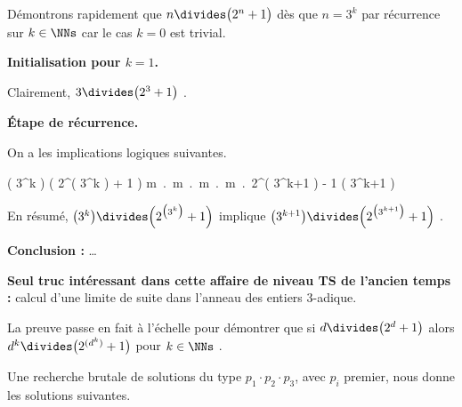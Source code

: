 \documentclass[12pt]{article}
\begin{document}
Démontrons rapidement que $n \divides \big( 2^n + 1 \big)$ dès que $n = 3^k$ par récurrence sur $k \in \NNs$ car le cas $k = 0$ est trivial.

\bigskip

\textbf{Initialisation pour $k = 1$.}

\smallskip

Clairement, $3 \divides \big( 2^3 + 1 \big)$ .

\bigskip

\textbf{Étape de récurrence.}

\smallskip

On a les implications logiques suivantes.

\medskip

\begin{stepcalc}[style=ar*, ope=\implies]
	\big( 3^k \big) \divides \Big( 2^{\big( 3^k \big)} + 1 \Big)
\explnext{}
	\exists m \in \ZZ \,.\, \Big[ 2^{\big( 3^k \big)} + 1 = m \cdot 3^k  \Big]
\explnext{}
	\exists m \in \ZZ \,.\, \Big[ 2^{\big( 3^k \big)} = - 1 + m \cdot 3^k  \Big]
\explnext{}
	\exists m \in \ZZ \,.\, \Big[ \left( 2^{\big( 3^k \big)} \right)^3 = \big( - 1 + m \cdot 3^k \big)^3  \Big]
\explnext{}
	\exists m \in \ZZ \,.\, \Big[ 2^{\big( 3^{k+1} \big)} = - 1 + 3 \cdot m \cdot 3^k - 3 \cdot \big( m \cdot 3^k \big)^2 + \big( m \cdot 3^k \big)^3  \Big]
	2^{\big( 3^{k+1} \big)} \equiv - 1 \mod\!\big( 3^{k+1} \big)
\end{stepcalc}

\smallskip

En résumé, 
$\big( 3^k \big) \divides \Big( 2^{\big( 3^k \big)} + 1 \Big)$ 
implique
$\big( 3^{k+1} \big) \divides \Big( 2^{\big( 3^{k+1} \big)} + 1 \Big)$  .

\bigskip

\textbf{Conclusion :} \dots

\bigskip

\textbf{Seul truc intéressant dans cette affaire de niveau TS de l'ancien temps :} calcul d'une limite de suite dans l'anneau des entiers $3$-adique.


\bigskip

La preuve passe en fait à l'échelle pour démontrer que si 
$d \divides \big( 2^d + 1 \big)$
alors
$d^k \divides \big( 2^{(d^k)} + 1 \big)$
pour $k \in \NNs$ .


\bigskip

Une recherche brutale de solutions du type $p_1 \cdot p_2 \cdot p_3$, avec $p_i$ premier, nous donne les solutions suivantes.
\end{document}

